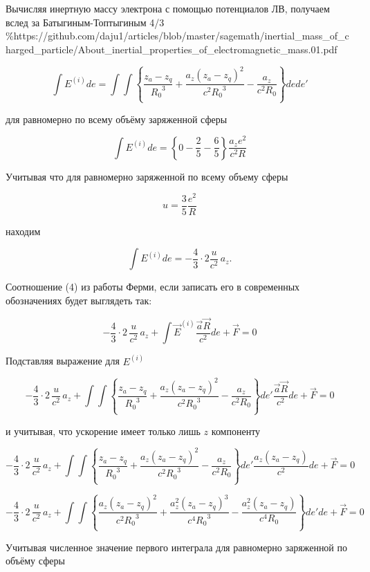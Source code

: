 \documentclass[11pt]{article}
\begin{document}
    Вычисляя инертную массу электрона с помощью потенциалов ЛВ, получаем
вслед за Батыгиным-Топтыгиным 4/3
\%https://github.com/daju1/articles/blob/master/sagemath/inertial\_mass\_of\_charged\_particle/About\_inertial\_properties\_of\_electromagnetic\_mass.01.pdf

\[\int {E}^{(i)} de = \int\int \left\{ \frac{z_a-z_q}{{{R}_{0}}^3}+\frac{a_z\left( {{z}_{a}}-{{z}_{q}} \right)^2}{c^2{{{R}_{0}}^3}}  -\frac{{a_z}}{{{c}^{2}}{{{R}_{0}}}}
 \right\}
de de'\]

для равномерно по всему объёму заряженной сферы

\[\int {E}^{(i)} de = \left\{ 0 - \frac{2}{5}  - \frac{6}{5} \right\}\frac{a_z e^2}{ c^2{{{R}}}}\]

Учитывая что для равномерно заряженной по всему объему сферы

\[u = \frac{3}{5}\frac{e^2}{R}\]

находим

\[\int {E}^{(i)} de = -\frac{4}{3} \cdot 2\frac{u}{c^2}\,a_z.\]

    Соотношение (4) из работы Ферми, если записать его в современных
обозначениях будет выглядеть так:

\[-\frac{4}{3}\cdot 2 \,\frac{u}{c^2} \, a_z + \int \vec E^{(i)}\frac{\vec a \vec R}{c^2} de + \vec F = 0\]

    Подставляя выражение для \({E}^{(i)}\)

\[-\frac{4}{3}\cdot 2 \,\frac{u}{c^2} \, a_z + \int \int
\left\{ \frac{z_a-z_q}{{{R}_{0}}^3}+\frac{a_z\left( {{z}_{a}}-{{z}_{q}} \right)^2}{c^2{{{R}_{0}}^3}}  -\frac{{a_z}}{{{c}^{2}}{{{R}_{0}}}}
 \right\}
de'\frac{\vec a \vec R}{c^2} de + \vec F = 0\]

    и учитывая, что ускорение имеет только лишь \(z\) компоненту

\[-\frac{4}{3}\cdot 2 \,\frac{u}{c^2} \, a_z + \int \int
\left\{ \frac{z_a-z_q}{{{R}_{0}}^3}+\frac{a_z\left( {{z}_{a}}-{{z}_{q}} \right)^2}{c^2{{{R}_{0}}^3}}  -\frac{{a_z}}{{{c}^{2}}{{{R}_{0}}}}
 \right\}
de'\frac{a_z \left(z_a-z_q\right)}{c^2} de + \vec F = 0\]

\[-\frac{4}{3}\cdot 2 \,\frac{u}{c^2} \, a_z + \int \int
\left\{ \frac{a_z\left(z_a-z_q\right)^2}{{c}^{2}{{R}_{0}}^3}+\frac{a_z^2\left( {{z}_{a}}-{{z}_{q}} \right)^3}{c^4{{{R}_{0}}^3}}  -\frac{{a_z^2}\left(z_a-z_q\right)}{{{c}^{4}}{{{R}_{0}}}}
 \right\}
de' de + \vec F = 0\]

    Учитывая численное значение первого интеграла для равномерно заряженной
по объёму сферы
\end{document}
